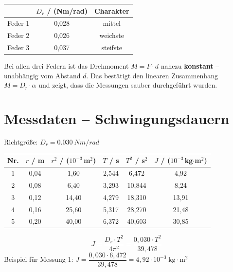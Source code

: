 \documentclass[11pt,a4paper]{scrartcl}
\begin{document}
\begin{center}
	\renewcommand{\arraystretch}{1.4}
	\begin{tabular}{|l|c|c|}
		\hline
		& $D_r$ / (Nm/rad) & Charakter \\
		\hline
		Feder 1 & 0,028 & mittel \\
		\hline
		Feder 2 & 0,026 & weichste \\
		\hline
		Feder 3 & 0,037 & steifste \\
		\hline
	\end{tabular}
\end{center}

\begin{hilfebox}[title={\faIcon{lightbulb} Qualität der Messungen}]
	Bei allen drei Federn ist das Drehmoment $M = F \cdot d$ nahezu \textbf{konstant} -- unabhängig vom Abstand $d$. Das bestätigt den linearen Zusammenhang $M = D_r \cdot \alpha$ und zeigt, dass die Messungen sauber durchgeführt wurden.
\end{hilfebox}

\newpage

\section*{Messdaten -- Schwingungsdauern}

Richtgröße: $D_r = \SI{0,030}{Nm/rad}$

\begin{center}
	\renewcommand{\arraystretch}{1.5}
	\begin{tabular}{|c|c|c|c|c|c|}
		\hline
		\textbf{Nr.} & $r$ / m & $r^2$ / ($10^{-3}\,$m$^2$) & $\overline{T}$ / s & $T^2$ / s$^2$ & $J$ / ($10^{-3}\,$kg$\cdot$m$^2$) \\
		\hline
		1 & 0,04 & 1,60 & 2,544 & 6,472 & 4,92 \\
		\hline
		2 & 0,08 & 6,40 & 3,293 & 10,844 & 8,24 \\
		\hline
		3 & 0,12 & 14,40 & 4,279 & 18,310 & 13,91 \\
		\hline
		4 & 0,16 & 25,60 & 5,317 & 28,270 & 21,48 \\
		\hline
		5 & 0,20 & 40,00 & 6,372 & 40,603 & 30,85 \\
		\hline
	\end{tabular}
\end{center}

\begin{formelbox}[title={\faIcon{square-root-alt} Berechnung von $J$}]
	\[
	J = \frac{D_r \cdot T^2}{4\pi^2} = \frac{0{,}030 \cdot T^2}{39{,}478}
	\]
	Beispiel für Messung 1: $J = \dfrac{0{,}030 \cdot 6{,}472}{39{,}478} = 4{,}92 \cdot 10^{-3}\;\text{kg}\cdot\text{m}^2$
\end{formelbox}
\end{document}
